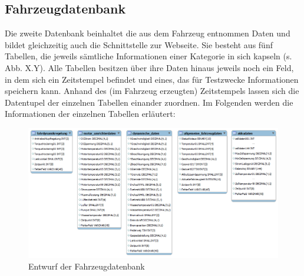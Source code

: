 \documentclass[fontsize = 12pt, paper = a4]{scrreprt}
\begin{document}
\subsection{Fahrzeugdatenbank}

Die zweite Datenbank beinhaltet die aus dem Fahrzeug entnommen Daten und bildet gleichzeitig auch die Schnittstelle zur Webseite. Sie besteht aus fünf Tabellen, die jeweils sämtliche Informationen einer Kategorie in sich kapseln (s. Abb. X.Y). Alle Tabellen besitzen über ihre Daten hinaus jeweils noch ein Feld, in dem sich ein Zeitstempel befindet und eines, das für Testzwecke Informationen speichern kann. Anhand des (im Fahrzeug erzeugten) Zeitstempels lassen sich die Datentupel der einzelnen Tabellen einander zuordnen. Im Folgenden werden die Informationen der einzelnen Tabellen erläutert:

\begin{figure}[h]
\centering
\includegraphics[scale = 0.43]{fahrzeugdatenbank} %
\caption[Entwurf Fahrzeugdatenbank]{Entwurf der Fahrzeugdatenbank}
\end{figure} 
\end{document}
